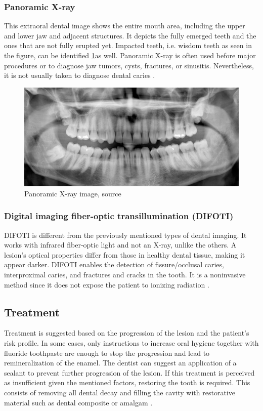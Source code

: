 \subsubsection{Panoramic X-ray}
This extraoral dental image shows the entire mouth area, including the upper and lower jaw and adjacent structures. It depicts the fully emerged teeth and the ones that are not fully erupted yet. Impacted teeth, i.e. wisdom teeth as seen in the figure, can be identified \ref{fig:panoramatic_xray}as well. Panoramic X-ray is often used before major procedures or to diagnose jaw tumors, cysts, fractures, or sinusitis. Nevertheless, it is not usually taken to diagnose dental caries \cite{clevland_xray}.

\begin{figure}
    \centering
    \includegraphics[width=\linewidth]{images/panoramatic_xray.jpg}
    \caption{Panoramic X-ray image, source \cite{Panoramatic2017}}
    \label{fig:panoramatic_xray}
\end{figure}


\subsubsection{Digital imaging fiber-optic transillumination (DIFOTI)}
DIFOTI is different from the previously mentioned types of dental imaging. It works with infrared fiber-optic light and not an X-ray, unlike the others. A lesion's optical properties differ from those in healthy dental tissue, making it appear darker. DIFOTI enables the detection of fissure/occlusal caries, interproximal caries, and fractures and cracks in the tooth. It is a noninvasive method since it does not expose the patient to ionizing radiation \cite{Strassler2014}.

\subsection{Treatment}
Treatment is suggested based on the progression of the lesion and the patient's risk profile. In some cases, only instructions to increase oral hygiene together with fluoride toothpaste are enough to stop the progression and lead to remineralization of the enamel. The dentist can suggest an application of a sealant to prevent further progression of the lesion. If this treatment is perceived as insufficient given the mentioned factors, restoring the tooth is required. This consists of removing all dental decay and filling the cavity with restorative material such as dental composite or amalgam \cite{2019a}\cite{2015}.

